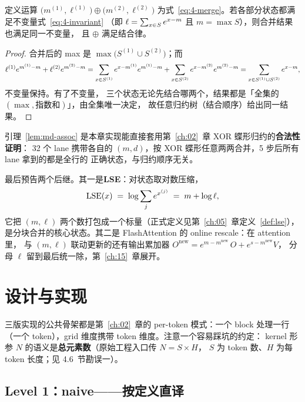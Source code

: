 \begin{lemma}[二元合并的结合律]\label{lem:md-assoc}
  定义运算 $\bigl(m^{(1)},\ell^{(1)}\bigr) \oplus \bigl(m^{(2)},\ell^{(2)}\bigr)$
  为式~\ref{eq:4-merge}。若各部分状态都满足不变量式~\ref{eq:4-invariant}
  （即 $\ell = \sum\sb{x \in S} e^{x - m}$ 且 $m = \max S$），则合并结果也满足同一不变量，
  且 $\oplus$ 满足结合律。
\end{lemma}
\begin{proof}
  合并后的 max 是 $\max\bigl(S^{(1)} \cup S^{(2)}\bigr)$；而
  \begin{equation*}
    \ell^{(1)} e^{m^{(1)}-m} + \ell^{(2)} e^{m^{(2)}-m}
    = \sum\sb{x \in S^{(1)}} e^{x-m^{(1)}} e^{m^{(1)}-m}
    + \sum\sb{x \in S^{(2)}} e^{x-m^{(2)}} e^{m^{(2)}-m}
    = \sum\sb{x \in S^{(1)} \cup S^{(2)}} e^{x - m},
  \end{equation*}
  不变量保持。有了不变量，
  三个状态无论先结合哪两个，结果都是「全集的 $(\max, \text{指数和})$」，由全集唯一决定，
  故任意归约树（结合顺序）给出同一结果。
\end{proof}

引理~\ref{lem:md-assoc} 是本章实现能直接套用第~\ref{ch:02}~章 XOR 蝶形归约的\textbf{合法性证明}：
32 个 lane 携带各自的 $(m, d)$，按 XOR 蝶形任意两两合并，5 步后所有 lane 拿到的都是全行的
正确状态，与归约顺序无关。

最后预告两个后继。其一是\textbf{LSE}：对状态取对数压缩，
\begin{equation}
  \mathrm{LSE}(x) \;=\; \log \sum\sb{j} e^{x^{(j)}} \;=\; m + \log \ell ,
  \label{eq:4-lse}
\end{equation}
它把 $(m, \ell)$ 两个数打包成一个标量（正式定义见第~\ref{ch:05}~章定义~\ref{def:lse}），
是分块合并的核心状态。其二是 FlashAttention 的 online rescale：在 attention 里，
与 $(m,\ell)$ 联动更新的还有输出累加器
$O^{\mathrm{new}} = e^{m - m^{\mathrm{new}}}\, O + e^{s - m^{\mathrm{new}}} V$，
分母 $\ell$ 留到最后统一除，第~\ref{ch:15}~章展开。

\section{设计与实现}

三版实现的公共骨架都是第~\ref{ch:02}~章的 per-token 模式：一个 block 处理一行
（一个 token），grid 维度携带 token 维度。注意一个容易踩坑的约定：
kernel 形参 $N$ 的语义是\textbf{总元素数}（原始工程入口传 $N = S \times H$，
$S$ 为 token 数、$H$ 为每 token 长度；见 4.6~节勘误一）。

\subsection{Level 1：naive——按定义直译}

